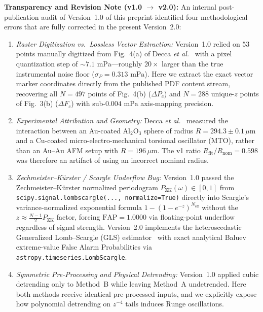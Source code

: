 \documentclass[10pt,twocolumn,a4paper]{article}
\begin{document}
\textbf{Transparency and Revision Note (v1.0 $\to$ v2.0):} An internal post-publication audit of Version~1.0 of this preprint identified four methodological errors that are fully corrected in the present Version~2.0:
\begin{enumerate}
\item \textit{Raster Digitization vs.\ Lossless Vector Extraction:} Version~1.0 relied on $53$ points manually digitized from Fig.~4(a) of Decca \textit{et al.}~\cite{decca2003} with a pixel quantization step of $\sim 7.1\text{ mPa}$---roughly $20\times$ larger than the true instrumental noise floor ($\sigma_P = 0.313\text{ mPa}$). Here we extract the exact vector marker coordinates directly from the published PDF content stream, recovering all $N = 497$ points of Fig.~4(b) ($\Delta P_c$) and $N = 288$ unique-$z$ points of Fig.~3(b) ($\Delta F_c$) with sub-$0.004\text{ mPa}$ axis-mapping precision.
\item \textit{Experimental Attribution and Geometry:} Decca \textit{et al.}~\cite{decca2003} measured the interaction between an Au-coated $\mathrm{Al}_2\mathrm{O}_3$ sphere of radius $R = 294.3 \pm 0.1\,\mu\mathrm{m}$ and a Cu-coated micro-electro-mechanical torsional oscillator (MTO), rather than an Au--Au AFM setup with $R = 196\,\mu\mathrm{m}$. The v1 ratio $R_{\mathrm{fit}}/R_{\mathrm{nom}} = 0.598$ was therefore an artifact of using an incorrect nominal radius.
\item \textit{Zechmeister--K\"urster / Scargle Underflow Bug:} Version~1.0 passed the Zechmeister--K\"urster normalized periodogram $P_{\mathrm{ZK}}(\omega) \in [0, 1]$ from \texttt{scipy.signal.lombscargle(..., normalize=True)} directly into Scargle's variance-normalized exponential formula $1 - (1 - e^{-z})^{N_{\mathrm{eff}}}$ without the $z \approx \frac{N-1}{2}P_{\mathrm{ZK}}$ factor, forcing $\mathrm{FAP} = 1.0000$ via floating-point underflow regardless of signal strength. Version~2.0 implements the heteroscedastic Generalized Lomb--Scargle (GLS) estimator~\cite{zechmeister2009} with exact analytical Baluev~\cite{baluev2008} extreme-value False Alarm Probabilities via \texttt{astropy.timeseries.LombScargle}.
\item \textit{Symmetric Pre-Processing and Physical Detrending:} Version~1.0 applied cubic detrending only to Method~B while leaving Method~A undetrended. Here both methods receive identical pre-processed inputs, and we explicitly expose how polynomial detrending on $z^{-4}$ tails induces Runge oscillations.
\end{enumerate}
\end{document}
